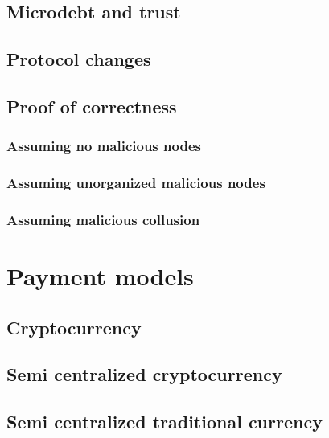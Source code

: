 \documentclass[11pt]{article}
\begin{document}
	\subsection{Microdebt and trust}


	\subsection{Protocol changes}

	\subsection{Proof of correctness}

	    \subsubsection{Assuming no malicious nodes}

	    \subsubsection{Assuming unorganized malicious nodes}

	    \subsubsection{Assuming malicious collusion}


\section{Payment models}

    \subsection{Cryptocurrency}

    \subsection{Semi centralized cryptocurrency}

    \subsection{Semi centralized traditional currency}
\end{document}
